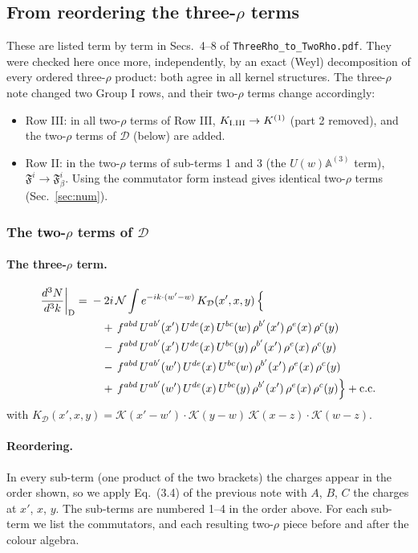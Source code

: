 \documentclass[10pt]{article}
\numberwithin{equation}{section}
\newcommand{\KK}{\mathcal K}
\newcommand{\NN}{\mathcal N}
\begin{document}
\subsection{From reordering the three-\texorpdfstring{$\rho$}{rho} terms}\label{sec:three}
These are listed term by term in Secs.~4--8 of \texttt{ThreeRho\_to\_TwoRho.pdf}. They were checked here once more, independently, by an exact (Weyl) decomposition of every ordered three-$\rho$ product: both agree in all kernel structures. The three-$\rho$ note changed two Group I rows, and their two-$\rho$ terms change accordingly:
\begin{itemize}
\item Row III: in all two-$\rho$ terms of Row III, $K_{\rm I.III}\to K^{(1)}$ (part 2 removed), and the two-$\rho$ terms of $\mathcal D$ (below) are added.
\item Row II: in the two-$\rho$ terms of sub-terms 1 and 3 (the $U(w)\mathbb A^{(3)}$ term), $\mathfrak F^i\to\mathfrak F^i_\beta$. Using the commutator form instead gives identical two-$\rho$ terms (Sec.~\ref{sec:num}).
\end{itemize}
\subsubsection*{The two-$\rho$ terms of $\mathcal D$}\label{sec:D}

\paragraph{The three-$\rho$ term.}
\begin{align}
\frac{d^3N}{d^3k}\bigg|_{\rm D}={}&-2i\,\NN\int e^{-ik\cdot(w'-w)}\,K_{\mathcal D}(x',x,y)\,\Big\{\notag\\
&\quad +\,f^{abd}\,U^{ab'}(x')\,U^{de}(x)\,U^{bc}(w)\,\rho^{b'}(x')\,\rho^{e}(x)\,\rho^{c}(y)\notag\\
&\quad -\,f^{abd}\,U^{ab'}(x')\,U^{de}(x)\,U^{bc}(y)\,\rho^{b'}(x')\,\rho^{e}(x)\,\rho^{c}(y)\notag\\
&\quad -\,f^{abd}\,U^{ab'}(w')\,U^{de}(x)\,U^{bc}(w)\,\rho^{b'}(x')\,\rho^{e}(x)\,\rho^{c}(y)\notag\\
&\quad +\,f^{abd}\,U^{ab'}(w')\,U^{de}(x)\,U^{bc}(y)\,\rho^{b'}(x')\,\rho^{e}(x)\,\rho^{c}(y)\Big\}+{\rm c.c.}\label{eq:in-D}
\end{align}
with $K_{\mathcal D}(x',x,y)=\KK(x'-w')\cdot\KK(y-w)\,\KK(x-z)\cdot\KK(w-z)$.
\paragraph{Reordering.} In every sub-term (one product of the two brackets) the charges appear in the order shown, so we apply Eq.~(3.4) of the previous note with $A$, $B$, $C$ the charges at $x'$, $x$, $y$. The sub-terms are numbered 1--4 in the order above. For each sub-term we list the commutators, and each resulting two-$\rho$ piece before and after the colour algebra.
\end{document}

